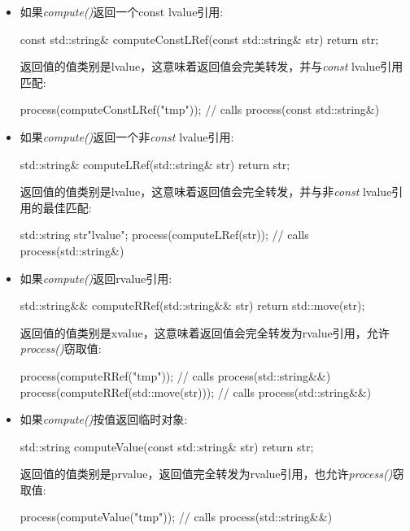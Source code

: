 \begin{itemize}
  \item 如果\textit{compute()}返回一个const lvalue引用:\par
\begin{codebox}[cpp]
  const std::string& computeConstLRef(const std::string& str) {
    return str;
  }
\end{codebox}
  返回值的值类别是lvalue，这意味着返回值会完美转发，并与\textit{const} lvalue引用匹配:\par
\begin{codebox}[cpp]
  process(computeConstLRef("tmp")); // calls process(const std::string&)
\end{codebox}
  \item 如果\textit{compute()}返回一个非\textit{const} lvalue引用:\par
\begin{codebox}[cpp]
  std::string& computeLRef(std::string& str) {
    return str;
  }
\end{codebox}
  返回值的值类别是lvalue，这意味着返回值会完全转发，并与非\textit{const} lvalue引用的最佳匹配:\par
\begin{codebox}[cpp]
  std::string str{"lvalue"};
  process(computeLRef(str)); // calls process(std::string&)
\end{codebox}
  \item 如果\textit{compute()}返回rvalue引用:\par
\begin{codebox}[cpp]
  std::string&& computeRRef(std::string&& str) {
    return std::move(str);
  }
\end{codebox}
  返回值的值类别是xvalue，这意味着返回值会完全转发为rvalue引用，允许\textit{process()}窃取值:\par
\begin{codebox}[cpp]
  process(computeRRef("tmp")); // calls process(std::string&&)
  process(computeRRef(std::move(str))); // calls process(std::string&&)
\end{codebox}
  \item 如果\textit{compute()}按值返回临时对象:\par
\begin{codebox}[cpp]
  std::string computeValue(const std::string& str) {
    return str;
  }
\end{codebox}
  返回值的值类别是prvalue，返回值完全转发为rvalue引用，也允许\textit{process()}窃取值:\par
\begin{codebox}[cpp]
  process(computeValue("tmp")); // calls process(std::string&&)
\end{codebox}
\end{itemize}

